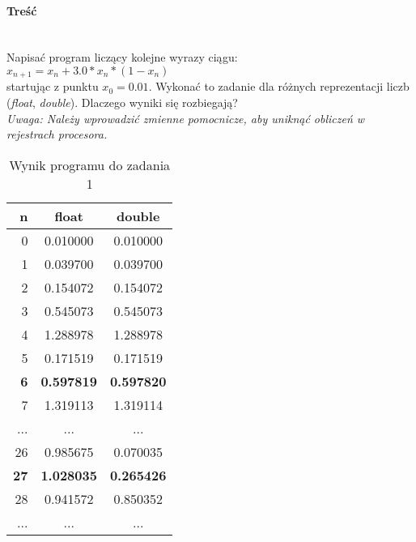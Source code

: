 \paragraph{Treść}~\\
Napisać program liczący kolejne wyrazy ciągu:\\
$ x_{n+1} = x_{n} + 3.0 * x_{n} * (1 - x_{n}) $\\
startując z punktu $ x_{0} = 0.01 $.
Wykonać to zadanie dla różnych reprezentacji liczb (\textit{float}, \textit{double}).
Dlaczego wyniki się rozbiegają?\\
\textit{Uwaga: Należy wprowadzić zmienne pomocnicze, aby uniknąć obliczeń w rejestrach procesora.}



\begin{table}[h]
  \caption{Wynik programu do zadania 1}
  \label{tab:WynikProgramuDoZadania1}
  \centering
  \begin{tabular}{r|c|c}
    n & float & double\\
    \hline 0 & 0.010000 & 0.010000\\
    \hline 1 & 0.039700 & 0.039700\\
    \hline 2 & 0.154072 & 0.154072\\
    \hline 3 & 0.545073 & 0.545073\\
    \hline 4 & 1.288978 & 1.288978\\
    \hline 5 & 0.171519 & 0.171519\\
    \hline \textbf{6} & \textbf{0.597819} & \textbf{0.597820}\\
    \hline 7 & 1.319113 & 1.319114\\
    \hline ... & ... & ...\\
    \hline 26 & 0.985675 & 0.070035\\
    \hline \textbf{27} & \textbf{1.028035} & \textbf{0.265426}\\
    \hline 28 & 0.941572 & 0.850352\\
    \hline ... & ... & ...\\
  \end{tabular}
\end{table}


